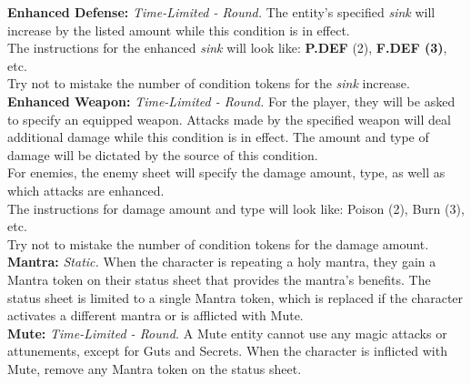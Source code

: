 \documentclass[12pt]{article}
\begin{document}
\begin{multicols*}{2}
\textbf{Enhanced Defense:} \emph{Time-Limited - Round.} The entity’s specified \emph{sink} will increase by the listed amount while this condition is in effect.\\
The instructions for the enhanced \emph{sink} will look like: \textbf{P.DEF} (2), \textbf{F.DEF (3)}, etc.\\
Try not to mistake the number of condition tokens for the \emph{sink} increase.\\

\textbf{Enhanced Weapon:} \emph{Time-Limited - Round.} For the player, they will be asked to specify an equipped weapon. Attacks made by the specified weapon will deal additional damage while this condition is in effect. The amount and type of damage will be dictated by the source of this condition.\\
For enemies, the enemy sheet will specify the damage amount, type, as well as which attacks are enhanced.\\
The instructions for damage amount and type will look like: Poison (2), Burn (3), etc.\\
Try not to mistake the number of condition tokens for the damage amount.\\

\textbf{Mantra:} \emph{Static.} When the character is repeating a holy mantra, they gain a Mantra token on their status sheet that provides the mantra’s benefits. The status sheet is limited to a single Mantra token, which is replaced if the character activates a different mantra or is afflicted with Mute.\\

\textbf{Mute:} \emph{Time-Limited - Round.} A Mute entity cannot use any magic attacks or attunements, except for Guts and Secrets. When the character is inflicted with Mute, remove any Mantra token on the status sheet.


\end{multicols*}
\end{document}
